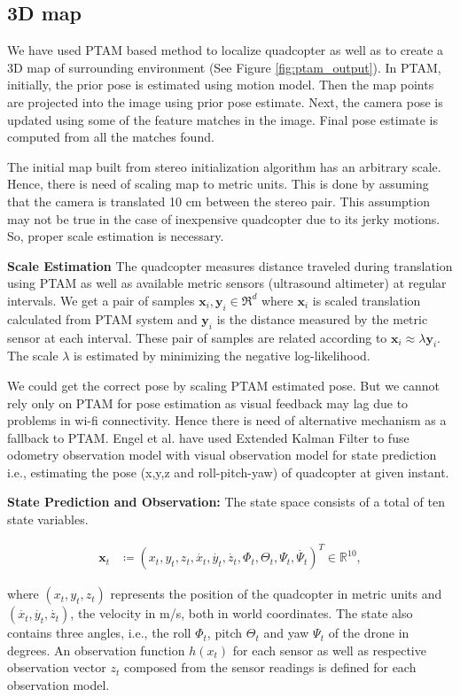 \subsection{3D map}
We have used PTAM based method \cite{engel} to localize quadcopter as well as to
create a 3D map of surrounding environment (See Figure \ref{fig:ptam_output}).
In PTAM, initially, the prior pose is estimated using motion model. Then the map
points are projected into the image using prior pose estimate. Next, the camera
pose is updated using some of the feature matches in the image. Final pose
estimate is computed from all the matches found.
 
The initial map built from stereo initialization algorithm has an arbitrary
scale. Hence, there is need of scaling map to metric units. This is done by
assuming that the camera is translated 10 cm between the stereo pair. This
assumption may not be true in the case of inexpensive quadcopter due to its jerky
motions. So, proper scale estimation is necessary.

\textbf{Scale Estimation}
The quadcopter measures distance traveled during translation using PTAM as well as
available metric sensors (ultrasound altimeter) at regular intervals. We get
a pair of samples $\mathbf{x}_i, \mathbf{y}_i \in {\Re}^d$ where $\mathbf{x}_i$ is
scaled translation calculated from PTAM system and $\mathbf{y}_i$ is the distance
measured by the metric sensor at each interval. These pair of samples are related
according to $\mathbf{x}_i \approx \lambda \mathbf{y}_i$. The scale $\lambda$ is
estimated by minimizing the negative log-likelihood\cite{engel}.  

We could get the correct pose by  scaling  PTAM estimated pose. But we
cannot rely only on PTAM for pose estimation as visual feedback may lag due to
problems in wi-fi connectivity. Hence there is need of  alternative
mechanism as a fallback to PTAM. Engel et al. \cite{engel} have used Extended
Kalman Filter to fuse odometry observation model with visual observation model for state prediction i.e.,
estimating the pose (x,y,z and roll-pitch-yaw) of quadcopter at given  instant.

\textbf{State Prediction and Observation:} The state space consists of a total
of ten state variables. 
\begin{ceqn}
\begin{align}
	\mathbf{x}_t &\coloneqq {(x_t, y_t, z_t, \dot{x_t}, \dot{y_t},
	\dot{z_t}, {\Phi}_t, {\Theta}_t, {\Psi}_t, \dot{{\Psi}_t} )}^T  \in
	{\mathbb{R}}^{10},
\end{align}
\end{ceqn}
where $(x_t, y_t, z_t)$ represents the position of the quadcopter in
metric units and $(\dot{x_t}, \dot{y_t}, \dot{z_t})$, the velocity in m/s, both
in world coordinates. The state also contains three angles, i.e., the roll
${\Phi}_t$, pitch ${\Theta}_t$ and yaw ${\Psi}_t$ of the drone in degrees.  An observation
function $h(x_t)$ for each sensor as well as respective observation vector $z_t$
composed from the sensor readings is defined for each observation model.

